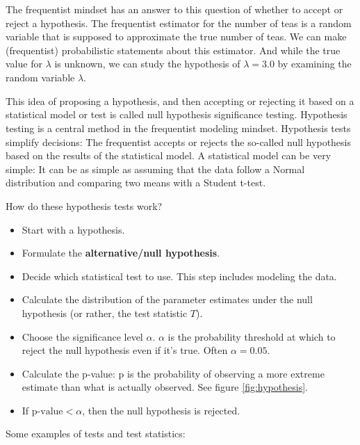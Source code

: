 \documentclass[
  10pt,
]{scrbook}
\providecommand{\tightlist}{%
  \setlength{\itemsep}{0pt}\setlength{\parskip}{0pt}}
\begin{document}
The frequentist mindset has an answer to this question of whether to accept or reject a hypothesis.
The frequentist estimator for the number of teas is a random variable that is supposed to approximate the true number of teas.
We can make (frequentist) probabilistic statements about this estimator.
And while the true value for \(\lambda\) is unknown, we can study the hypothesis of \(\lambda = 3.0\) by examining the random variable \(\hat{\lambda}\).

This idea of proposing a hypothesis, and then accepting or rejecting it based on a statistical model or test is called null hypothesis significance testing.
Hypothesis testing is a central method in the frequentist modeling mindset.
Hypothesis tests simplify decisions:
The frequentist accepts or rejects the so-called null hypothesis based on the results of the statistical model.
A statistical model can be very simple:
It can be as simple as assuming that the data follow a Normal distribution and comparing two means with a Student t-test.

How do these hypothesis tests work?

\begin{itemize}
\tightlist
\item
  Start with a hypothesis.
\item
  Formulate the \textbf{alternative/null hypothesis}.
\item
  Decide which statistical test to use. This step includes modeling the data.
\item
  Calculate the distribution of the parameter estimates under the null hypothesis (or rather, the test statistic \(T\)).
\item
  Choose the significance level \(\alpha\). \(\alpha\) is the probability threshold at which to reject the null hypothesis even if it's true. Often \(\alpha = 0.05\).
\item
  Calculate the p-value: p is the probability of observing a more extreme estimate than what is actually observed. See figure \ref{fig:hypothesis}.
\item
  If \(\text{p-value} <\alpha\), then the null hypothesis is rejected.
\end{itemize}

Some examples of tests and test statistics:
\end{document}
